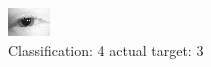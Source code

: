 \begin{figure}[h!]
\begin{center}
\includegraphics[width=0.60\columnwidth]{figures/ID135_class_4_target_3.png}
\end{center}
\caption{ Classification: 4 actual target: 3}
\label{fig:ID135_class_4_target_3}
\end{figure}
